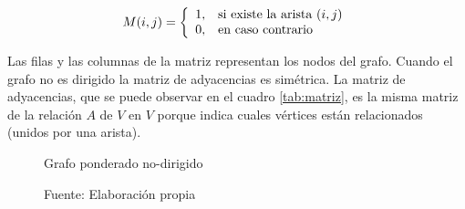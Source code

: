         \begin{displaymath}
          M(i,j) = \left\{
          \begin{array}{ l l }
            1, & \textrm{si existe la arista } (i,j) \\
            0, & \textrm{en caso contrario}
          \end{array} \right.
        \end{displaymath}


        Las filas y las columnas de la matriz representan los nodos del grafo.
        Cuando el grafo no es dirigido la matriz de adyacencias es simétrica.
        La matriz de adyacencias, que se puede observar en el cuadro \ref{tab:matriz}, es la  misma matriz de la relación $A$ de $V$ en $V$ porque indica cuales v\'ertices están relacionados (unidos por una arista).


        \begin{figure}[H]
          \begin{center}


            \caption{Grafo ponderado no-dirigido}
            \label{fig:grafo_ponderado}
            \caption*{Fuente: Elaboración propia}

          \end{center}
        \end{figure}

